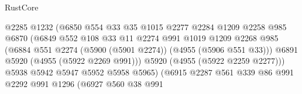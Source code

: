 \begin{lexlean}{RustCore}
\begin{coremodule}
                                        @2285
                                        @1232
                                        (@6850
                                          @554
                                          @33
                                          @35
                                          @1015
                                          @2277
                                          @2284
                                          @1209
                                          @2258
                                          @985
                                          @6870
                                          (@6849
                                            @552
                                            @108
                                            @33
                                            @11
                                            @2274
                                            @991
                                            @1019
                                            @1209
                                            @2268
                                            @985
                                            (@6884
                                              @551
                                              @2274
                                              (@5900 (@5901 @2274))
                                              (@4955 (@5906 @551 @33)))
                                            @6891
                                            @5920
                                            (@4955 (@5922 @2269 @991)))
                                          @5920
                                          (@4955 (@5922 @2259 @2277)))
                                        @5938
                                        @5942
                                        @5947
                                        @5952
                                        @5958
                                        @5965)
                                      (@6915
                                        @2287
                                        @561
                                        @339
                                        @86
                                        @991
                                        @2292
                                        @991
                                        @1296
                                        (@6927
                                          @560
                                          @38
                                          @991

\end{coremodule}
\end{lexlean}
